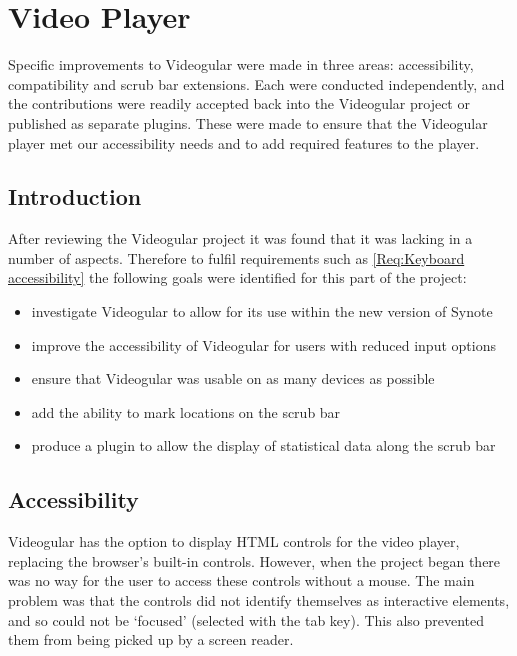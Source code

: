 
\chapter{Video Player}
\label{Chapter:Video Player}

\begin{preamble}
	Specific improvements to \gls{Videogular} were made in three areas: accessibility, compatibility and scrub bar extensions. Each were conducted independently, and the contributions were readily accepted back into the \gls{Videogular} project or published as separate plugins. These were made to ensure that the \gls{Videogular} player met our accessibility needs and to add required features to the player.
\end{preamble}

\section{Introduction}

After reviewing the \gls{Videogular} project it was found that it was lacking in a number of aspects. Therefore to fulfil requirements such as \cref{Req:Keyboard accessibility} the following goals were identified for this part of the project:

\begin{itemize}
	\item investigate \gls{Videogular} to allow for its use within the new version of Synote
	\item improve the accessibility of \gls{Videogular} for users with reduced input options
	\item ensure that \gls{Videogular} was usable on as many devices as possible
	\item add the ability to mark locations on the \gls{scrub bar}
	\item produce a plugin to allow the display of statistical data along the \gls{scrub bar}
\end{itemize}

\section{Accessibility}
\label{Section:Accessibility}
\gls{Videogular} has the option to display HTML controls for the video player, replacing the browser's built-in controls. However, when the project began there was no way for the user to access these controls without a mouse. The main problem was that the controls did not identify themselves as interactive elements, and so could not be `focused' (selected with the tab key). This also prevented them from being picked up by a screen reader.

